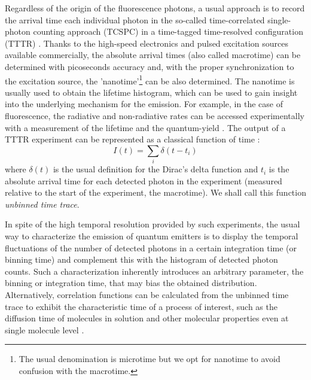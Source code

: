 Regardless of the origin of the fluorescence photons, a usual approach is to record the arrival time each individual 
photon in the so-called time-correlated single-photon counting approach (TCSPC) in a time-tagged 
time-resolved configuration (TTTR) \cite{Wahl_picoquant}. 
Thanks to the high-speed electronics and pulsed excitation sources available commercially, 
the absolute arrival times (also called macrotime) can be determined with picoseconds accuracy and, with the proper synchronization to the excitation source, the 'nanotime'\footnote{The usual denomination is microtime but we opt for nanotime to avoid confusion with the macrotime.} can be also determined. 
The nanotime is usually used to obtain the lifetime histogram, which can be used to 
gain insight into the underlying mechanism for the emission. For example, 
in the case of fluorescence, the radiative and non-radiative rates can be accessed experimentally with a 
measurement of the lifetime and the quantum-yield \cite{lakowicz2007principles}.
The output of a TTTR experiment can be represented as a classical function of time \cite{Lippitz2005}:
\begin{equation}
I(t) = \sum_i \delta( t-t_i)
\label{eq:intensity_TCSPC}
\end{equation}
where $\delta(t)$ is the usual definition for the Dirac's delta function and $t_i$ is the absolute arrival time
for each detected photon in the experiment (measured relative to the start of the experiment, the macrotime). 
We shall call this function \textit{unbinned time trace}.

In spite of the high temporal resolution provided by such experiments, 
the usual way to characterize the emission of quantum emitters is to 
display the temporal fluctuations of the number of detected photons 
in a certain integration time (or binning time) and
complement this with the histogram of detected photon counts. 
Such a characterization inherently introduces an arbitrary parameter, 
the binning or integration time, that may bias the obtained distribution\cite{Lippitz2005}. 
Alternatively, correlation functions can be calculated from the unbinned
 time trace to exhibit the characteristic 
time of a process of interest, such as the diffusion time of molecules
in solution\cite{magde1972thermodynamic,haustein2007fluorescence} and 
other molecular properties even at single molecule level \cite{medina2002fluorescence}.

